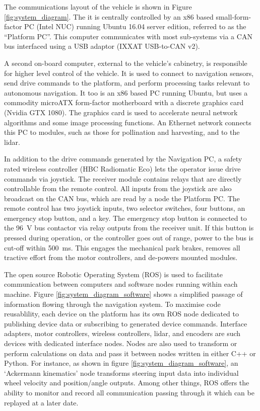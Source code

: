 \documentclass[preprint,authoryear,12pt]{elsarticle}
\begin{document}
        The communications layout of the vehicle is shown in Figure \ref{fig:system_diagram}.
        The it is centrally controlled by an x86 based small-form-factor PC (Intel NUC) running Ubuntu 16.04 server edition, referred to as the ``Platform PC''.
        This computer communicates with most sub-systems via a CAN bus interfaced using a USB adaptor (IXXAT USB-to-CAN v2).

        A second on-board computer, external to the vehicle's cabinetry, is responsible for higher level control of the vehicle.
        It is used to connect to navigation sensors, send drive commands to the platform, and perform processing tasks relevant to autonomous navigation.
        It too is an x86 based PC running Ubuntu, but uses a commodity microATX form-factor motherboard with a discrete graphics card (Nvidia GTX 1080).
        The graphics card is used to accelerate neural network algorithms and some image processing functions.
        An Ethernet network connects this PC to modules, such as those for pollination and harvesting, and to the lidar.

        In addition to the drive commands generated by the Navigation PC, a safety rated wireless controller (HBC Radiomatic Eco) lets the operator issue drive commands via joystick.
        The receiver module contains relays that are directly controllable from the remote control.
        All inputs from the joystick are also broadcast on the CAN bus, which are read by a node the Platform PC.
        The remote control has two joystick inputs, two selector switches, four buttons, an emergency stop button, and a key.
        The emergency stop button is connected to the \SI{96}{\volt} bus contactor via relay outputs from the receiver unit.
        If this button is pressed during operation, or the controller goes out of range, power to the bus is cut-off within \SI{500}{\milli\second}.
        This engages the mechanical park brakes, removes all tractive effort from the motor controllers, and de-powers mounted modules.


        The open source Robotic Operating System (ROS) is used to facilitate communication between computers and software nodes running within each machine.
        Figure \ref{fig:system_diagram_software} shows a simplified passage of information flowing through the navigation system.
        To maximise code reusablility, each device on the platform has its own ROS node dedicated to publishing device data or subscribing to generated device commands.
        Interface adapters, motor controllers, wireless controllers, lidar, and encoders are such devices with dedicated interface nodes.
        Nodes are also used to transform or perform calculations on data and pass it between nodes written in either C++ or Python.
        For instance, as shown in figure \ref{fig:system_diagram_software}, an `Ackermann kinematics' node transforms steering input data into individual wheel velocity and position/angle outputs.
        Among other things, ROS offers the ability to monitor and record all communication passing through it which can be replayed at a later date.
\end{document}
